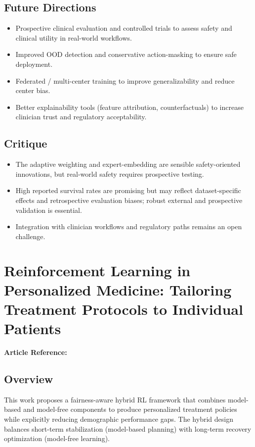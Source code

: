 \subsection*{Future Directions}
\begin{itemize}
    \item Prospective clinical evaluation and controlled trials to assess safety and clinical utility in real-world workflows.
    \item Improved OOD detection and conservative action-masking to ensure safe deployment.
    \item Federated / multi-center training to improve generalizability and reduce center bias.
    \item Better explainability tools (feature attribution, counterfactuals) to increase clinician trust and regulatory acceptability.
\end{itemize}

\subsection*{Critique}
\begin{itemize}
    \item The adaptive weighting and expert-embedding are sensible safety-oriented innovations, but real-world safety requires prospective testing.
    \item High reported survival rates are promising but may reflect dataset-specific effects and retrospective evaluation biases; robust external and prospective validation is essential.
    \item Integration with clinician workflows and regulatory paths remains an open challenge.
\end{itemize}

\section{Reinforcement Learning in Personalized Medicine: Tailoring Treatment Protocols to Individual Patients}
\textbf{Article Reference:} \cite{banumathiReinforcementLearningPersonalized2025c}

\subsection*{Overview}
This work proposes a fairness-aware hybrid RL framework that combines model-based and model-free components to produce personalized treatment policies while explicitly reducing demographic performance gaps. The hybrid design balances short-term stabilization (model-based planning) with long-term recovery optimization (model-free learning).

